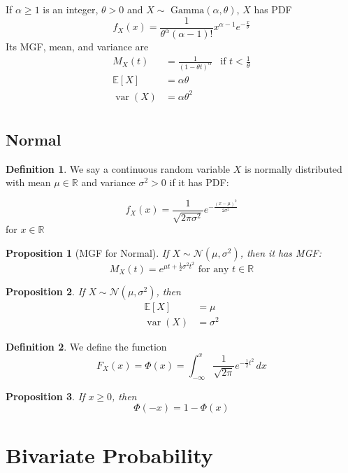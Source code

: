 \documentclass[
]{article}
\newtheorem{proposition}{Proposition}[section]
\theoremstyle{definition}
\newtheorem{definition}{Definition}[section]
\theoremstyle{definition}
\theoremstyle{definition}
\theoremstyle{remark}
\newcommand{\fxx}{f_X(x)}
\newcommand{\Fxx}{F_X(x)}
\newcommand{\mx}[1]{M_X(#1)}
\newcommand{\E}[1]{\mathbb{E}[#1]}
\newcommand{\euler}{e}
\newcommand{\varx}{\operatorname{var}(X)}
\newcommand{\gmma}[1]{\sim\text{ Gamma}\left( #1 \right)}
\newcommand{\norm}[2]{\sim\mathcal{N}\left( #1, #2 \right)}
\begin{document}
If $\alpha\geq 1$ is an integer, $\theta>0$ and $X\gmma{\alpha,\theta}$, $X$ has PDF
\[\fxx=\frac{1}{\theta^\alpha (\alpha - 1)!} x^{\alpha-1}e^{-\frac{x}{\theta}}\]
Its MGF, mean, and variance are
\begin{align*}
  \mx{t} & =\frac{1}{(1-\theta t)^\alpha} & \text{if }t<\frac{1}{\theta} \\
  \E{X}  & =\alpha\theta                                                 \\
  \varx  & =\alpha\theta^2                                               \\
\end{align*}

\subsection{Normal}

\begin{definition}
  We say a continuous random variable $X$ is normally distributed with mean $\mu \in \mathbb{R}$ and variance $\sigma^2 > 0$ if it has PDF:

  \[\fxx = \frac{1}{\sqrt{2\pi\sigma^2}}\euler^{-\frac{(x - \mu)^2}{2\sigma^2}}\] for $x \in \mathbb{R}$

\end{definition}

\begin{proposition}[MGF for Normal]
  If $X\norm{\mu}{\sigma^2}$, then it has MGF:
  \[\mx{t} = \euler^{\mu t + \frac{1}{2}\sigma^2 t^2} \text{ for any } t \in \mathbb{R}\]
\end{proposition}

\begin{proposition}
  If $X\norm{\mu}{\sigma^2}$, then
  \begin{align*}
    \E{X} & =\mu      \\
    \varx & =\sigma^2
  \end{align*}
\end{proposition}

\begin{definition}
  We define the function
  \[\Fxx = \Phi (x) = \int_{-\infty}^{x} \frac{1}{\sqrt{2\pi}}\euler^{-\frac{1}{2}t^2} \,dx \]
\end{definition}

\begin{proposition}
  If $x \geq 0$, then
  \[\Phi(-x) = 1 - \Phi(x)\]
\end{proposition}

\section{Bivariate Probability}
\end{document}
